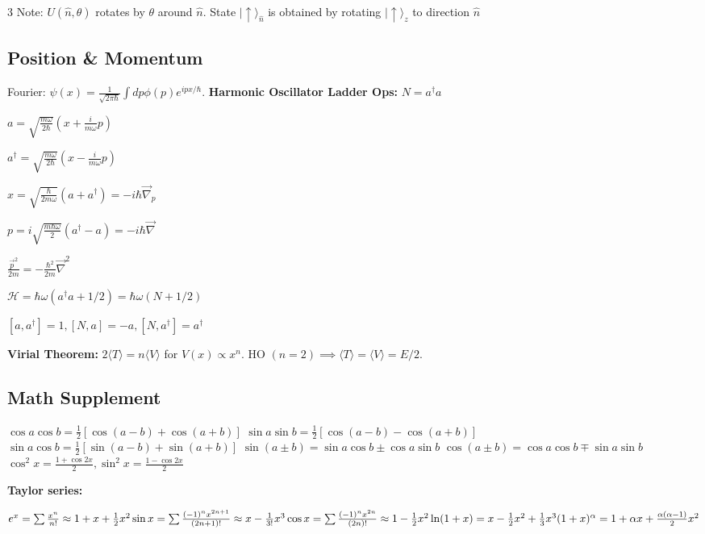 \documentclass[10pt,a4paper]{article}
\begin{document}
\begin{multicols*}{3}
Note: $U(\hat{n}, \theta)$ rotates by $\theta$ around $\hat{n}$. State $|\uparrow\rangle_{\hat{n}}$ is obtained by rotating $|\uparrow\rangle_z$ to direction $\hat{n}$

\subsection*{Position \& Momentum}
Fourier: $\psi(x) = \frac{1}{\sqrt{2\pi\hbar}} \int dp \phi(p) e^{ipx/\hbar}$.
\textbf{Harmonic Oscillator Ladder Ops:}
$N = a^\dagger a$

$a = \sqrt{\frac{m\omega}{2\hbar}} (x + \frac{i}{m\omega}p)$

$a^\dagger = \sqrt{\frac{m\omega}{2\hbar}} (x - \frac{i}{m\omega}p)$

$x = \sqrt{\frac{\hbar}{2m\omega}}(a + a^\dagger) = -i\hbar\vec{\nabla}_p$

$p = i\sqrt{\frac{m\hbar\omega}{2}}(a^\dagger - a) = -i\hbar\vec{\nabla}$

$\frac{\vec{p}^2}{2m}=-\frac{\hbar^2}{2m}\vec{\nabla}^2$

$\mathcal{H} = \hbar\omega(a^\dagger a + 1/2) = \hbar\omega(N + 1/2)$

$[a, a^\dagger] = 1, [N, a] = -a, [N, a^\dagger] = a^\dagger$

\textbf{Virial Theorem:} $2\langle T \rangle = n\langle V \rangle$ for $V(x) \propto x^n$.
HO $(n=2) \implies \langle T \rangle = \langle V \rangle = E/2$.

\subsection*{Math Supplement}
$\cos a \cos b = \frac{1}{2}[\cos(a-b)+\cos(a+b)]$
$\sin a \sin b = \frac{1}{2}[\cos(a-b)-\cos(a+b)]$
$\sin a \cos b = \frac{1}{2}[\sin(a-b)+\sin(a+b)]$
$\sin(a\pm b) = \sin a\cos b \pm \cos a\sin b$
$\cos(a\pm b) = \cos a\cos b \mp \sin a\sin b$
$\cos^2 x = \frac{1+\cos 2x}{2}, \sin^2 x = \frac{1-\cos 2x}{2}$

\textbf{Taylor series:}

$e^x = \sum \frac{x^n}{n!} \approx 1 + x + \frac{1}{2} x^2 \\
\sin x = \sum \frac{(-1)^n x^{2n+1}}{(2n+1)!} \approx x - \frac{1}{3!} x^3\\
\cos x = \sum \frac{(-1)^n x^{2n}}{(2n)!} \approx 1 - \frac{1}{2}x^2 \\
\ln(1+x) = x - \frac{1}{2}x^2 + \frac{1}{3}x^3 \\
(1+x)^\alpha = 1 +\alpha x + \frac{\alpha(\alpha-1)}{2}x^2$


\end{multicols*}
\end{document}
